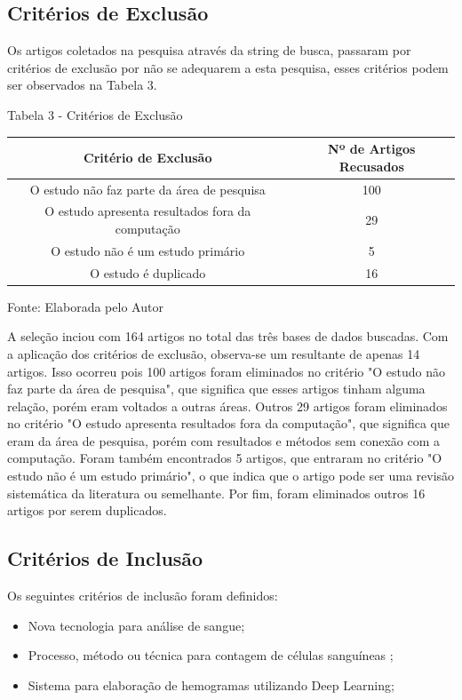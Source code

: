 \subsection{Critérios de Exclusão}

Os artigos coletados na pesquisa através da string de busca, passaram por critérios de exclusão por não se adequarem a esta pesquisa, esses critérios podem ser observados na Tabela 3. 

\begin{center}
Tabela 3 - Critérios de Exclusão
\begin{center}
\begin{tabular}{|c|c|}
\hline
\textbf{Critério de Exclusão} & \textbf{Nº de Artigos Recusados} \\ \hline
O estudo não faz parte da área de pesquisa & 100 \\ \hline
O estudo apresenta resultados fora da computação & 29 \\ \hline
O estudo não é um estudo primário & 5 \\ \hline
O estudo é duplicado & 16 \\ \hline
\end{tabular}
\end{center}
Fonte: Elaborada pelo Autor
\end{center}

A seleção inciou com 164 artigos no total das três bases de dados buscadas. Com a aplicação dos critérios de exclusão, observa-se um resultante de apenas 14 artigos. Isso ocorreu pois 100 artigos foram eliminados no critério "O estudo não faz parte da área de pesquisa", que significa que esses artigos tinham alguma relação, porém eram voltados a outras áreas. Outros 29 artigos foram eliminados no critério "O estudo apresenta resultados fora da computação", que significa que eram da área de pesquisa, porém com resultados e métodos sem conexão com a computação. Foram também encontrados 5 artigos, que entraram no critério "O estudo não é um estudo primário", o que indica que o artigo pode ser uma revisão sistemática da literatura ou semelhante. Por fim, foram eliminados outros 16 artigos por serem duplicados.

\subsection{Critérios de Inclusão}

Os seguintes critérios de inclusão foram definidos:
\begin{itemize}
\item Nova tecnologia para análise de sangue;
\item Processo, método ou técnica para contagem de células sanguíneas ;
\item Sistema para elaboração de hemogramas utilizando Deep Learning;
\end{itemize}

